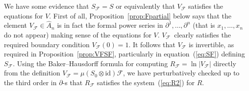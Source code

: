 \documentclass[10pt,a4paper]{amsart}
\def\id{\mathrm{id}}
\numberwithin{equation}{section}
\begin{document}
We have some evidence that $S_{\mathcal{F}} = S$ or equivalently that $V_{\mathcal{F}}$ satisfies the equations for $V$. First of all, Proposition~\ref{prop:Fpartial} below says that the element $V_{\mathcal{F}}\in\hat{A}_n$ is in fact the formal power series in $\partial^1,\dots,\partial^n$ (that is $x_1,\dots, x_n$ do not appear) making sense of the equations for $V$. $V_{\mathcal{F}}$~clearly satisfies the required boundary condition $V_{\mathcal{F}}(0) = 1$. It follows that $V_{\mathcal{F}}$ is invertible, as required in Proposition~\ref{prop:VFSF}, particularly in equation~(\ref{eq:SF}) defining $S_{\mathcal{F}}$. Using the Baker--Hausdorff formula for computing $R_\mathcal{F} = \ln|V_{\mathcal{F}}|$ directly from the definition $V_{\mathcal{F}}=\mu(S_0\otimes\id)\mathcal{F}$, we have perturbatively checked up to the third order in $\partial$-s that $R_{\mathcal{F}}$ satisfies the system~(\ref{eq:R2}) for $R$.
\end{document}

